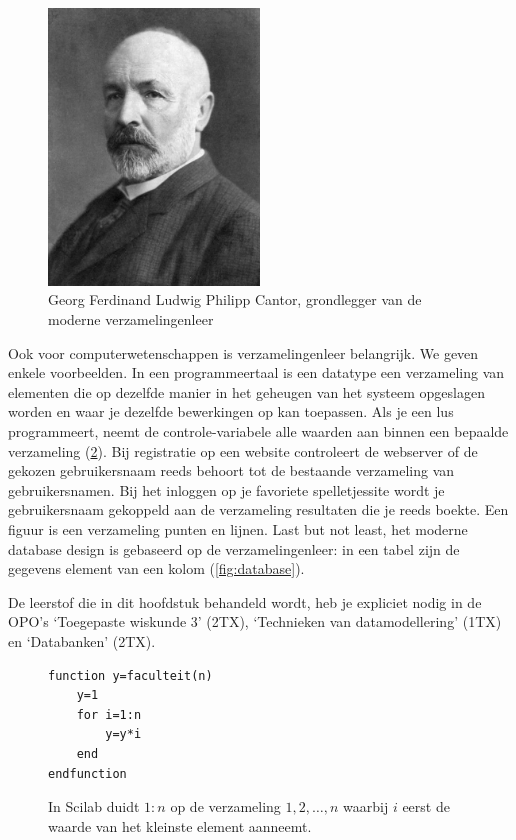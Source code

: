 \begin{figure}[htbp]
\centering
\includegraphics[width=0.5\textwidth]{figuren/verzamelingen_relaties/cantor.jpg}
\caption{Georg Ferdinand Ludwig Philipp Cantor, grondlegger van de moderne verzamelingenleer}
\label{fig:cantor}
\end{figure}
Ook voor computerwetenschappen is verzamelingenleer belangrijk. We geven enkele voorbeelden.  In een programmeertaal is een datatype een verzameling van elementen die op dezelfde manier in het geheugen van het systeem opgeslagen worden en waar je dezelfde bewerkingen op kan toepassen. Als je een lus programmeert, neemt de controle-variabele alle waarden aan binnen een bepaalde verzameling (\cref{fig:lusScilab}). Bij registratie op een website controleert de webserver of de gekozen gebruikersnaam reeds behoort tot de bestaande verzameling van gebruikersnamen. Bij het inloggen op je favoriete spelletjessite wordt je gebruikersnaam gekoppeld aan de verzameling resultaten die je reeds boekte. Een figuur is een verzameling punten en lijnen. Last but not least, het moderne database design is gebaseerd op de verzamelingenleer: in een tabel zijn de gegevens element van een kolom (\cref{fig:database}). 

De leerstof die in dit hoofdstuk behandeld wordt, heb je expliciet nodig in de OPO's `Toegepaste wiskunde 3' (2TX), `Technieken van datamodellering' (1TX) en `Databanken' (2TX).

\begin{figure}
\begin{verbatim}
function y=faculteit(n)
    y=1
    for i=1:n
        y=y*i
    end
endfunction
\end{verbatim}
\caption{In Scilab duidt $1:n$ op de  verzameling  $1,2,\dots,n$ waarbij $i$ eerst de waarde van het kleinste element aanneemt.}
\label{fig:lusScilab}
\end{figure}

